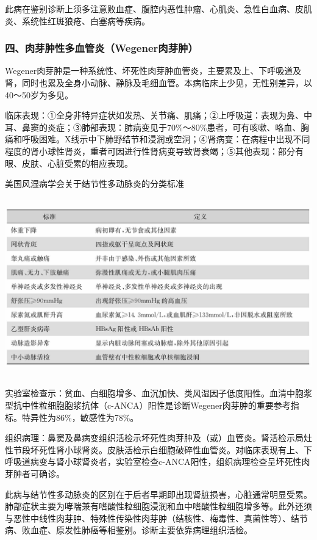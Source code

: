 此病在鉴别诊断上须多注意败血症、腹腔内恶性肿瘤、心肌炎、急性白血病、皮肌炎、系统性红斑狼疮、白塞病等疾病。

\subsubsection{四、肉芽肿性多血管炎（Wegener肉芽肿）}

Wegener肉芽肿是一种系统性、坏死性肉芽肿血管炎，主要累及上、下呼吸道及肾，同时也累及全身小动脉、静脉及毛细血管。本病临床上少见，无性别差异，以40～50岁为多见。

临床表现：①全身非特异症状如发热、关节痛、肌痛；②上呼吸道：表现为鼻、中耳、鼻窦的炎症；③肺部表现：肺病变见于70\%～80\%患者，可有咳嗽、咯血、胸痛和呼吸困难。X线示中下肺野结节和浸润或空洞；④肾病变：在病程中出现不同程度的肾小球性肾炎，重者可因进行性肾病变导致肾衰竭；⑤其他表现：部分有眼、皮肤、心脏受累的相应表现。

\begin{table}[htbp]
\centering
\caption{美国风湿病学会关于结节性多动脉炎的分类标准}
\label{tab2-22}
\includegraphics[width=5.91667in,height=3.03125in]{./images/Image00029.jpg}
\end{table}

实验室检查示：贫血、白细胞增多、血沉加快、类风湿因子低度阳性。血清中胞浆型抗中性粒细胞胞浆抗体（c-ANCA）阳性是诊断Wegener肉芽肿的重要参考指标。特异性为86\%，敏感性为78\%。

组织病理：鼻窦及鼻病变组织活检示坏死性肉芽肿及（或）血管炎。肾活检示局灶性节段坏死性肾小球肾炎。皮肤活检示白细胞破碎性血管炎。对临床表现有上、下呼吸道病变与肾小球肾炎者，实验室检查c-ANCA阳性，组织病理检查呈坏死性肉芽肿者可确诊。

此病与结节性多动脉炎的区别在于后者早期即出现肾脏损害，心脏通常明显受累。肺部症状主要为哮喘兼有嗜酸性粒细胞浸润和血中嗜酸性粒细胞增多等。此外还须与恶性中线性肉芽肿、特殊性传染性肉芽肿（结核性、梅毒性、真菌性等）、结节病、败血症、原发性肺癌等相鉴别。诊断主要依靠病理组织活检。

